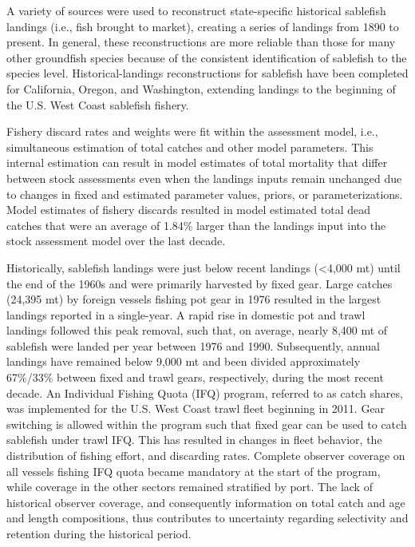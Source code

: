 \documentclass[11pt,
  english,
  a4paper,
]{article}
\begin{document}
\leavevmode\tagmcend\tagstructend


A variety of sources were used to reconstruct state-specific historical sablefish landings (i.e., fish brought to market), creating a series of landings from 1890 to present. In general, these reconstructions are more reliable than those for many other groundfish species because of the consistent identification of sablefish to the species level. Historical-landings reconstructions for sablefish have been completed for California, Oregon, and Washington, extending landings to the beginning of the U.S. West Coast sablefish fishery.

\leavevmode\tagmcend\tagstructend\par


Fishery discard rates and weights were fit within the assessment model, i.e., simultaneous estimation of total catches and other model parameters. This internal estimation can result in model estimates of total mortality that differ between stock assessments even when the landings inputs remain unchanged due to changes in fixed and estimated parameter values, priors, or parameterizations. Model estimates of fishery discards resulted in model estimated total dead catches that were an average of 1.84\% larger than the landings input into the stock assessment model over the last decade.

\leavevmode\tagmcend\tagstructend\par


Historically, sablefish landings were just below recent landings (\textless4,000 mt) until the end of the 1960s and were primarily harvested by fixed gear. Large catches (24,395 mt) by foreign vessels fishing pot gear in 1976 resulted in the largest landings reported in a single-year. A rapid rise in domestic pot and trawl landings followed this peak removal, such that, on average, nearly 8,400 mt of sablefish were landed per year between 1976 and 1990. Subsequently, annual landings have remained below 9,000 mt and been divided approximately 67\%/33\% between fixed and trawl gears, respectively, during the most recent decade. An Individual Fishing Quota (IFQ) program, referred to as catch shares, was implemented for the U.S. West Coast trawl fleet beginning in 2011. Gear switching is allowed within the program such that fixed gear can be used to catch sablefish under trawl IFQ. This has resulted in changes in fleet behavior, the distribution of fishing effort, and discarding rates. Complete observer coverage on all vessels fishing IFQ quota became mandatory at the start of the program, while coverage in the other sectors remained stratified by port. The lack of historical observer coverage, and consequently information on total catch and age and length compositions, thus contributes to uncertainty regarding selectivity and retention during the historical period.
\end{document}
